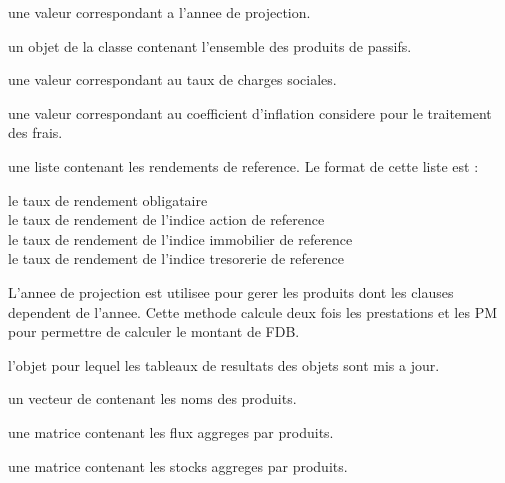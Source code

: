 \documentclass[a4paper]{book}
\begin{document}
\begin{Arguments}
\begin{ldescription}
\item[\code{an}] une valeur  correspondant a l'annee de projection.

\item[\code{x}] un objet de la classe  contenant l'ensemble des produits de passifs.

\item[\code{tx\_soc}] une valeur  correspondant au taux de charges sociales.

\item[\code{coef\_inf}] une valeur  correspondant au coefficient d'inflation
considere pour le traitement des frais.

\item[\code{list\_rd}] une liste contenant les rendements de reference. Le format de cette liste est :
\begin{description}

\item[le taux de rendement obligataire] 
\item[le taux de rendement de l'indice action de reference] 
\item[le taux de rendement de l'indice immobilier de reference] 
\item[le taux de rendement de l'indice tresorerie de reference] 

\end{description}

\end{ldescription}
\end{Arguments}
%
\begin{Details}\relax
L'annee de projection est utilisee pour gerer les produits dont les clauses dependent de l'annee.
Cette methode calcule deux fois les prestations et les PM pour permettre de calculer le montant de FDB.
\end{Details}
%
\begin{Value}
 l'objet pour lequel les tableaux de resultats des objets  sont mis a jour.

 un vecteur de  contenant les noms des produits.

 une matrice contenant les flux aggreges par produits.

 une matrice contenant les stocks aggreges par produits.
\end{Value}
\end{document}
